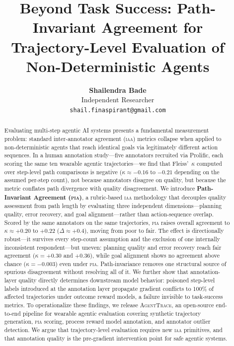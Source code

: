 \documentclass{article}
\title{Beyond Task Success: Path-Invariant Agreement for
       Trajectory-Level Evaluation of Non-Deterministic Agents}
\author{%
  \textbf{Shailendra Bade} \\
  Independent Researcher \\
  \texttt{shail.finaspirant@gmail.com}
}
\newcommand{\PIA}{\textsc{pia}}          %
\newcommand{\AgentTrace}{\textsc{AgentTrace}}
\begin{document}
\maketitle

\begin{abstract}
Evaluating multi-step agentic AI systems presents a fundamental measurement
problem: standard inter-annotator agreement (\textsc{iaa}) metrics collapse
when applied to non-deterministic agents that reach identical goals via
legitimately different action sequences.
%
In a human annotation study---five annotators recruited via Prolific, each
scoring the same ten wearable agentic trajectories---we find that
Fleiss'~$\kappa$ computed over step-level path comparisons is negative
($\kappa \approx -0.16$ to $-0.21$ depending on the assumed per-step count),
not because annotators disagree on quality, but because the metric conflates
path divergence with quality disagreement.
%
We introduce \textbf{Path-Invariant Agreement (\PIA{})}, a rubric-based
\textsc{iaa} methodology that decouples quality assessment from path length by
evaluating three independent dimensions---planning quality, error recovery, and
goal alignment---rather than action-sequence overlap.
%
Scored by the same annotators on the same trajectories, \PIA{} raises overall
agreement to $\kappa \approx +0.20$ to $+0.22$ ($\Delta \approx +0.4$), moving
from poor to fair. The effect is directionally robust---it survives every
step-count assumption and the exclusion of one internally inconsistent
respondent---but uneven: planning quality and error recovery reach fair
agreement ($\kappa = +0.30$ and $+0.36$), while goal alignment shows no
agreement above chance ($\kappa = -0.003$) even under \PIA{}. Path-invariance
removes one structural source of spurious disagreement without resolving all
of it.
%
We further show that annotation-layer quality directly determines downstream
model behavior: poisoned step-level labels introduced at the annotation layer
propagate gradient conflicts to 100\% of affected trajectories under outcome
reward models, a failure invisible to task-success metrics.
%
To operationalize these findings, we release \AgentTrace{}, an open-source
end-to-end pipeline for wearable agentic evaluation covering synthetic
trajectory generation, \PIA{} scoring, process reward model annotation, and
annotator outlier detection.
%
We argue that trajectory-level evaluation requires new \textsc{iaa} primitives,
and that annotation quality is the pre-gradient intervention point for safe
agentic systems.
\end{abstract}
\end{document}

